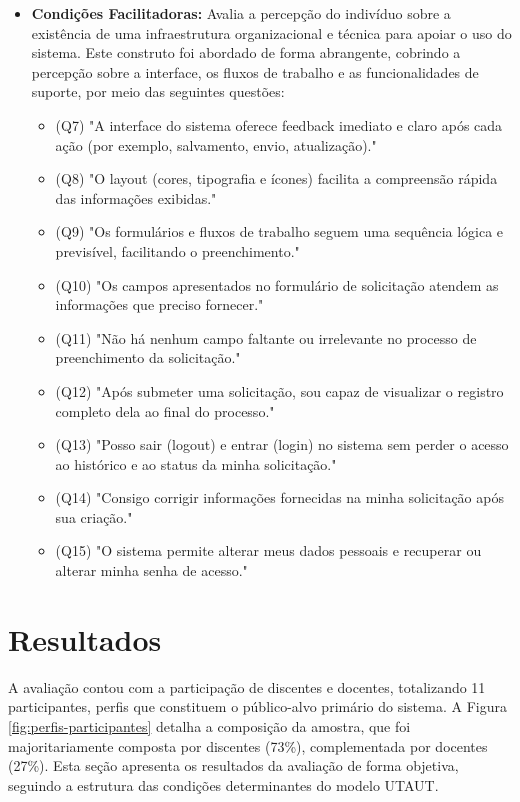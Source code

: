 \documentclass[portuguese]{sbc2025}%
\begin{document}
\begin{itemize}
    \item \textbf{Condições Facilitadoras:} Avalia a percepção do indivíduo sobre a existência de uma infraestrutura organizacional e técnica para apoiar o uso do sistema. Este construto foi abordado de forma abrangente, cobrindo a percepção sobre a interface, os fluxos de trabalho e as funcionalidades de suporte, por meio das seguintes questões:
    \begin{itemize}
        \item (Q7) "A interface do sistema oferece feedback imediato e claro após cada ação (por exemplo, salvamento, envio, atualização)." 
        \item (Q8) "O layout (cores, tipografia e ícones) facilita a compreensão rápida das informações exibidas."
        \item (Q9) "Os formulários e fluxos de trabalho seguem uma sequência lógica e previsível, facilitando o preenchimento." 
        \item (Q10) "Os campos apresentados no formulário de solicitação atendem as informações que preciso fornecer." 
        \item (Q11) "Não há nenhum campo faltante ou irrelevante no processo de preenchimento da solicitação." 
        \item (Q12) "Após submeter uma solicitação, sou capaz de visualizar o registro completo dela ao final do processo."
        \item (Q13) "Posso sair (logout) e entrar (login) no sistema sem perder o acesso ao histórico e ao status da minha solicitação." 
        \item (Q14) "Consigo corrigir informações fornecidas na minha solicitação após sua criação." 
        \item (Q15) "O sistema permite alterar meus dados pessoais e recuperar ou alterar minha senha de acesso." 
    \end{itemize}
\end{itemize}

\section{Resultados}
\label{sec:resultados}

A avaliação contou com a participação de discentes e docentes, totalizando 11 participantes, perfis que constituem o público-alvo primário do sistema. A Figura \ref{fig:perfis-participantes} detalha a composição da amostra, que foi majoritariamente composta por discentes (73\%), complementada por docentes (27\%). Esta seção apresenta os resultados da avaliação de forma objetiva, seguindo a estrutura das condições determinantes do modelo UTAUT.
\end{document}
